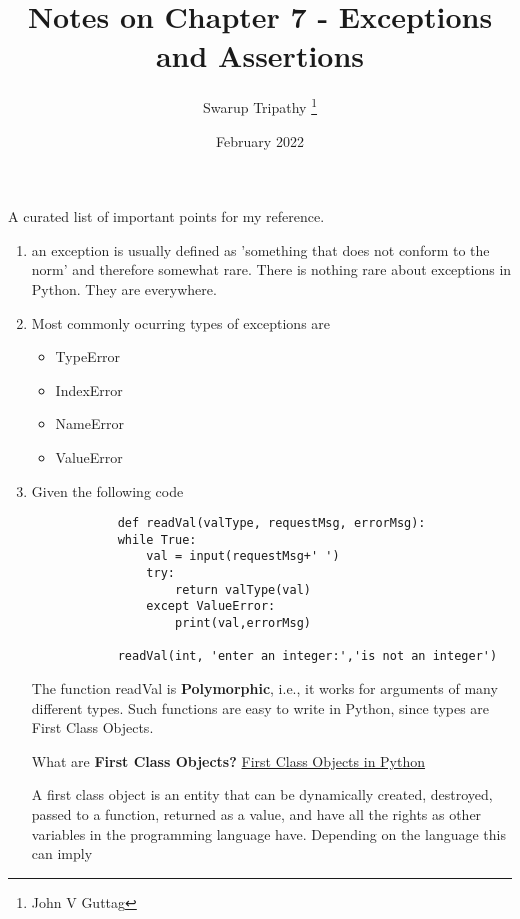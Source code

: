\documentclass[11pt]{article}
\title{Notes on Chapter 7 - Exceptions and Assertions}
\author{Swarup Tripathy \thanks{John V Guttag}}
\date{February 2022}
\begin{document}
    \maketitle
    A curated list of important points for my reference.\\
    \begin{enumerate}
        \item an exception is usually defined as 'something that does not conform to the norm' and therefore somewhat rare. There is nothing rare about exceptions in Python. They are everywhere.
        \item Most commonly ocurring types of exceptions are 
        \begin{itemize}
            \item TypeError
            \item IndexError
            \item NameError
            \item ValueError
        \end{itemize}
        \item Given the following code 
        \begin{verbatim}
            def readVal(valType, requestMsg, errorMsg):
            while True:
                val = input(requestMsg+' ')
                try:
                    return valType(val)
                except ValueError:
                    print(val,errorMsg)
        
            readVal(int, 'enter an integer:','is not an integer')
        \end{verbatim}
        The function readVal is \textbf{Polymorphic}, i.e., it works for arguments of many different types. Such functions are easy to write in Python, since types are First Class Objects.

        What are \textbf{First Class Objects?} \href{https://stackoverflow.com/questions/245192/what-are-first-class-objects}{First Class Objects in Python}
        
        A first class object is an entity that can be dynamically created, destroyed, passed to a function, returned as a value, and have all the rights as other variables in the programming language have. 
        Depending on the language this can imply


\end{enumerate}
\end{document}
